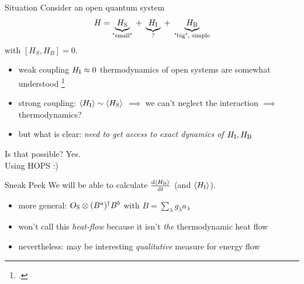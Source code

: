 \documentclass[10pt, aspectratio=169]{beamer}
\begin{document}
\begin{frame}
  \begin{block}{Situation}
    Consider an open quantum system
    \begin{equation}
      \label{eq:openthermo}
      H=\underbrace{H_{\mathrm{S}}}_{\text{"small"}}\; +\;
      \underbrace{H_{\mathrm{I}}}_{\mathrm{?}} \;+\;
      \underbrace{H_{\mathrm{B}}}_{\text{"big", simple}}
    \end{equation}
    with \([H_S, H_B] = 0\).
  \end{block}
  \pause
  \begin{itemize}[<+->]
  \item weak coupling \(H_{\mathrm{I}}\approx 0\)
    thermodynamics of open systems
    are somewhat understood \footcite{Rivas2019Oct,Talkner2020Oct}
  \item strong coupling: \(\ev{H_\inter} \sim \ev{H_\sys}\)
    \(\implies\) we can't neglect the interaction \(\implies\)
    thermodynamics?
  \item but what is clear: \emph{need to get access to exact dynamics
      of \(H_{\mathrm{I}},H_{\mathrm{B}}\)}
  \end{itemize}
\end{frame}
\begin{frame}
  \begin{center}
    \huge{Is that possible? \pause{}Yes.}\\\pause{}
    \huge{Using HOPS :)}
    \pause{}
  \end{center}
  \begin{block}{Sneak Peek}
      We will be able to calculate
      \(\dv{\ev{H_\bath}}{t}\) (and \(\ev{H_\inter}\)).
      \begin{itemize}
      \item more general: \(O_{\mathrm{S}}\otimes (B^a)^\dag B^b\) with \(B=∑_{λ}g_{λ}a_{λ}\)
      \end{itemize}
  \end{block}
  \pause{}
  \begin{itemize}[<+->]
  \item won't call this \emph{heat-flow} because it isn't
    \emph{the} thermodynamic heat flow
  \item nevertheless: may be interesting \emph{qualitative} measure
    for energy flow
  \end{itemize}
\end{frame}
\end{document}
